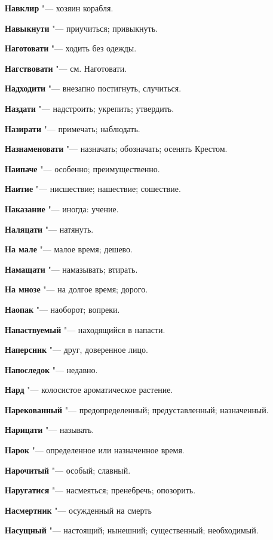 \begin{mymulticols}
\noindent\textbf{Навклир} "--- хозяин корабля. 

\noindent\textbf{Навыкнути} "--- приучиться; привыкнуть. 

\noindent\textbf{Наготовати} "--- ходить без одежды. 

\noindent\textbf{Нагствовати} "--- см. Наготовати. 

\noindent\textbf{Надходити} "--- внезапно постигнуть, случиться. 

\noindent\textbf{Наздати} "--- надстроить; укрепить; утвердить. 

\noindent\textbf{Назирати} "--- примечать; наблюдать. 

\noindent\textbf{Назнаменовати} "--- назначать; обозначать; осенять Крестом. 

\noindent\textbf{Наипаче} "--- особенно; преимущественно. 

\noindent\textbf{Наитие} "--- нисшествие; нашествие; сошествие. 

\noindent\textbf{Наказание} "--- иногда: учение. 

\noindent\textbf{Наляцати} "--- натянуть. 

\noindent\textbf{На мале} "--- малое время; дешево. 

\noindent\textbf{Намащати} "--- намазывать; втирать. 

\noindent\textbf{На мнозе} "--- на долгое время; дорого. 

\noindent\textbf{Наопак} "--- наоборот; вопреки. 

\noindent\textbf{Напаствуемый} "--- находящийся в напасти. 

\noindent\textbf{Наперсник} "--- друг, доверенное лицо. 

\noindent\textbf{Напоследок} "--- недавно. 

\noindent\textbf{Нард} "--- колосистое ароматическое растение. 

\noindent\textbf{Нарекованный} "--- предопределенный; предуставленный; назначенный. 

\noindent\textbf{Нарицати} "--- называть. 

\noindent\textbf{Нарок} "--- определенное или назначенное время. 

\noindent\textbf{Нарочитый} "--- особый; славный. 

\noindent\textbf{Наругатися} "--- насмеяться; пренебречь; опозорить. 

\noindent\textbf{Насмертник} "--- осужденный на смерть 

\noindent\textbf{Насущный} "--- настоящий; нынешний; существенный; необходимый. 


\end{mymulticols}
